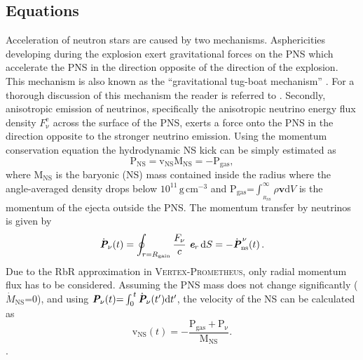 \documentclass[fleqn,usenatbib]{mnras}
\newcommand{\ud}{\ensuremath{\mathrm{d}}\xspace}
\newcommand{\gcc}{\text{g}\, \text{cm}^{-3}}
\newcommand{\vertexprom}{\textsc{Vertex-Prometheus}\xspace}
\begin{document}
\subsection{Equations}
Acceleration of neutron stars are caused by two mechanisms. 
Asphericities developing during the explosion exert gravitational forces on the PNS which accelerate the PNS in the direction opposite of the direction of the explosion. This mechanism is also known as the ``gravitational tug-boat mechanism'' \citep{Wongwathanarat2013}. For a thorough discussion of this mechanism the reader is referred to \citet{Scheck2006,Wongwathanarat2013,Janka2017,Gessner2018,Mueller2019}.
Secondly, anisotropic emission of neutrinos, specifically the anisotropic neutrino energy flux density $F_{\mathrm{\nu}}^{\mathrm{e}}$ across the surface of the PNS, exerts a force onto the PNS in the direction opposite to the stronger neutrino emission.
Using the momentum conservation equation the hydrodynamic NS kick can be simply estimated as
\begin{equation}
  \pmb{\mathrm{P}}_{\mathrm{NS}} = \pmb{\mathrm{v}}_{\mathrm{NS}}\mathrm{M_{NS}} = -\pmb{\mathrm{P}}_{\mathrm{gas}},
\end{equation}
where $\mathrm{M_{NS}}$ is the baryonic (NS) mass contained inside the radius where the angle-averaged density drops below $10^{11}\, \gcc$ and $\pmb{\mathrm{P}}_{\mathrm{gas}}\mathord{=}\int_{_{R_{\mathrm{NS}}}}^{\infty} \rho\pmb{v}\ud V$ is the momentum of the ejecta outside the PNS.
The momentum transfer by neutrinos is given by
\begin{equation}
    \label{equ:nukick}
    \dot{\textit{\textbf{P}}}_{\nu} (t) = \oint_{r = R_\mathrm{gain}}
    \frac{F_{\nu}}{c}\ \textit{\textbf{e}}_r \, \ud S
    = - \dot{\textit{\textbf{P}}}_\mathrm{ns}^{\,\nu} (t) \,.
\end{equation}
Due to the RbR approximation in \vertexprom, only radial momentum flux has
to be considered.
Assuming the PNS mass does not change significantly ($\dot{M}_{\mathrm{NS}}\mathord{=}0$), and using $\textit{\textbf{P}}_\nu (t)\mathord{=}\int_0^{\, t} \dot{\textit{\textbf{P}}}_{\nu} 
(t')\mathrm{d}t'$, the velocity of the NS can be calculated as
\begin{equation}
  \pmb{\mathrm{v}}_{\mathrm{NS}}(t) = - \frac{\pmb{\mathrm{P}}_{\mathrm{gas}} + \pmb{\mathrm{P}}_{\mathrm{\nu}}}{ \mathrm{M_{NS}}}.
  \label{equ:momentum_kick}
\end{equation}.
\end{document}
